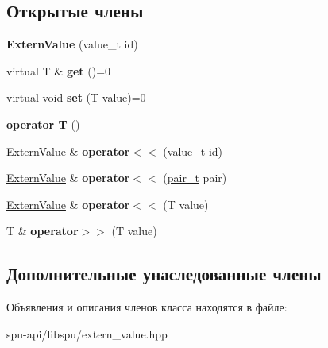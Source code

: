 \subsection*{Открытые члены}
\begin{DoxyCompactItemize}
\item 
\mbox{\label{class_s_p_u_1_1_extern_value_aae7c6b4abbca7304d954311c58f32f4d}} 
{\bfseries Extern\+Value} (value\+\_\+t id)
\item 
\mbox{\label{class_s_p_u_1_1_extern_value_a8d8b98b83b4258cb2f5df76ffb10b4e0}} 
virtual T \& {\bfseries get} ()=0
\item 
\mbox{\label{class_s_p_u_1_1_extern_value_a4f55910a34f9de7442f5517a0bb2cce2}} 
virtual void {\bfseries set} (T value)=0
\item 
\mbox{\label{class_s_p_u_1_1_extern_value_a6dc813c5d3721e291dea8586626c5319}} 
{\bfseries operator T} ()
\item 
\mbox{\label{class_s_p_u_1_1_extern_value_a62b3eb77df1467e81933dd6b3c6226a9}} 
\hyperlink{class_s_p_u_1_1_extern_value}{Extern\+Value} \& {\bfseries operator$<$$<$} (value\+\_\+t id)
\item 
\mbox{\label{class_s_p_u_1_1_extern_value_a2757fc6516ddbd1bf072cfafc98fd6fc}} 
\hyperlink{class_s_p_u_1_1_extern_value}{Extern\+Value} \& {\bfseries operator$<$$<$} (\hyperlink{struct_s_p_u_1_1pair__containter}{pair\+\_\+t} pair)
\item 
\mbox{\label{class_s_p_u_1_1_extern_value_aebe4ab28ad7d22c38aa622df2dbbe142}} 
\hyperlink{class_s_p_u_1_1_extern_value}{Extern\+Value} \& {\bfseries operator$<$$<$} (T value)
\item 
\mbox{\label{class_s_p_u_1_1_extern_value_acbb2ab9a89ce0d56f1bdafe8f0b9b796}} 
T \& {\bfseries operator$>$$>$} (T value)
\end{DoxyCompactItemize}
\subsection*{Дополнительные унаследованные члены}


Объявления и описания членов класса находятся в файле\+:\begin{DoxyCompactItemize}
\item 
spu-\/api/libspu/extern\+\_\+value.\+hpp\end{DoxyCompactItemize}
